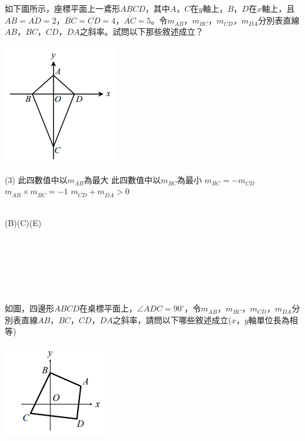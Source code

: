 \documentclass
[answers]
{exam}
\theoremstyle{definition}
\begin{document}
\begin{questions}
\begin{minipage}[t]{0.7\linewidth}
	如下圖所示，座標平面上一鳶形$ABCD$，其中$A$，$C$在$y$軸上，$B$，$D$在$x$軸上，且$\overline{AB} = \overline{AD} = 2$，$\overline{BC} = \overline{CD} = 4$，$\overline{AC}=5$。令$m_{\overline{AB}}$，$m_{\overline{BC}}$，$m_{\overline{CD}}$，$m_{\overline{DA}}$分別表直線$AB$，$BC$，$CD$，$DA$之斜率。試問以下那些敘述成立？
\end{minipage}
\hfill
\begin{minipage}[t]{0.3\linewidth}
	\vspace*{-0.3cm}
	\includegraphics[scale=1]{./chapter_3/figure/2.png}
	\raggedleft %
\end{minipage}
\begin{tasks}(3)
	\task 此四數值中以$m_{\overline{AB}}$為最大
	\task 此四數值中以$m_{\overline{BC}}$為最小
	\task $m_{\overline{BC}} = -m_{\overline{CD}}$
	\task $m_{\overline{AB}} \times m_{\overline{BC}} = -1$
	\task $m_{\overline{CD}} + m_{\overline{DA}} > 0$
\end{tasks}
\begin{solution}~\\
	(B)(C)(E)
\end{solution}
$ $\\$ $\\$ $\\$ $\\$ $\\
\question

\begin{minipage}[t]{0.7\linewidth}
	如圖，四邊形$ABCD$在桌標平面上，$\angle ADC = 90^{\circ}$，令$m_{AB}$，$m_{BC}$，$m_{CD}$，$m_{DA}$分別表直線$AB$，$BC$，$CD$，$DA$之斜率，請問以下哪些敘述成立($x$，$y$軸單位長為相等)
\end{minipage}
\hfill
\begin{minipage}[t]{0.3\linewidth}
	\vspace*{-0.3cm}
	\includegraphics[scale=1]{./chapter_3/figure/3.png}
	\raggedleft %
\end{minipage}


\end{questions}
\end{document}
